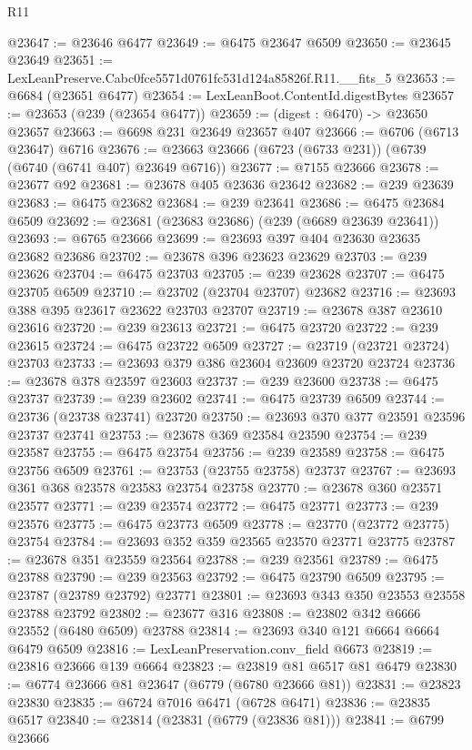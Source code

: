 \begin{lexlean}{R11}
\begin{coremodule}
@23647 := @23646 @6477
@23649 := @6475 @23647 @6509
@23650 := @23645 @23649
@23651 := LexLeanPreserve.Cabc0fce5571d0761fc531d124a85826f.R11.__fits_5
@23653 := @6684 (@23651 @6477)
@23654 := LexLeanBoot.ContentId.digestBytes
@23657 := @23653 (@239 (@23654 @6477))
@23659 := (digest : @6470) -> @23650 @23657
@23663 := @6698 @231 @23649 @23657 @407
@23666 := @6706 (@6713 @23647) @6716
@23676 := @23663 @23666 (@6723 (@6733 @231)) (@6739 (@6740 (@6741 @407) @23649 @6716))
@23677 := @7155 @23666
@23678 := @23677 @92
@23681 := @23678 @405 @23636 @23642
@23682 := @239 @23639
@23683 := @6475 @23682
@23684 := @239 @23641
@23686 := @6475 @23684 @6509
@23692 := @23681 (@23683 @23686) (@239 (@6689 @23639 @23641))
@23693 := @6765 @23666
@23699 := @23693 @397 @404 @23630 @23635 @23682 @23686
@23702 := @23678 @396 @23623 @23629
@23703 := @239 @23626
@23704 := @6475 @23703
@23705 := @239 @23628
@23707 := @6475 @23705 @6509
@23710 := @23702 (@23704 @23707) @23682
@23716 := @23693 @388 @395 @23617 @23622 @23703 @23707
@23719 := @23678 @387 @23610 @23616
@23720 := @239 @23613
@23721 := @6475 @23720
@23722 := @239 @23615
@23724 := @6475 @23722 @6509
@23727 := @23719 (@23721 @23724) @23703
@23733 := @23693 @379 @386 @23604 @23609 @23720 @23724
@23736 := @23678 @378 @23597 @23603
@23737 := @239 @23600
@23738 := @6475 @23737
@23739 := @239 @23602
@23741 := @6475 @23739 @6509
@23744 := @23736 (@23738 @23741) @23720
@23750 := @23693 @370 @377 @23591 @23596 @23737 @23741
@23753 := @23678 @369 @23584 @23590
@23754 := @239 @23587
@23755 := @6475 @23754
@23756 := @239 @23589
@23758 := @6475 @23756 @6509
@23761 := @23753 (@23755 @23758) @23737
@23767 := @23693 @361 @368 @23578 @23583 @23754 @23758
@23770 := @23678 @360 @23571 @23577
@23771 := @239 @23574
@23772 := @6475 @23771
@23773 := @239 @23576
@23775 := @6475 @23773 @6509
@23778 := @23770 (@23772 @23775) @23754
@23784 := @23693 @352 @359 @23565 @23570 @23771 @23775
@23787 := @23678 @351 @23559 @23564
@23788 := @239 @23561
@23789 := @6475 @23788
@23790 := @239 @23563
@23792 := @6475 @23790 @6509
@23795 := @23787 (@23789 @23792) @23771
@23801 := @23693 @343 @350 @23553 @23558 @23788 @23792
@23802 := @23677 @316
@23808 := @23802 @342 @6666 @23552 (@6480 @6509) @23788
@23814 := @23693 @340 @121 @6664 @6664 @6479 @6509
@23816 := LexLeanPreservation.conv_field @6673
@23819 := @23816 @23666 @139 @6664
@23823 := @23819 @81 @6517 @81 @6479
@23830 := @6774 @23666 @81 @23647 (@6779 (@6780 @23666 @81))
@23831 := @23823 @23830
@23835 := @6724 @7016 @6471 (@6728 @6471)
@23836 := @23835 @6517
@23840 := @23814 (@23831 (@6779 (@23836 @81)))
@23841 := @6799 @23666

\end{coremodule}
\end{lexlean}

